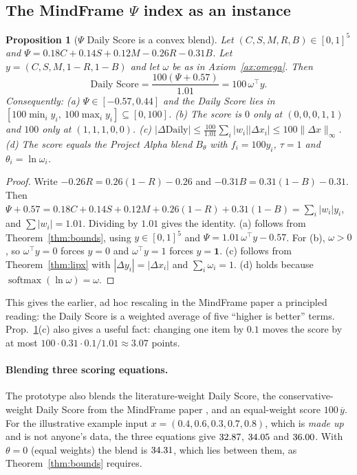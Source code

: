 \documentclass[11pt]{article}
\newtheorem{proposition}{Proposition}
\theoremstyle{definition}
\theoremstyle{remark}
\newcommand{\one}{\mathbf{1}}
\newcommand{\ninf}[1]{\lVert #1\rVert_\infty}
\DeclareMathOperator{\softmax}{softmax}
\begin{document}
\subsection{The MindFrame $\Psi$ index as an instance}
\begin{proposition}[$\Psi$ Daily Score is a convex blend]\label{prop:psi}
Let $(C,S,M,R,B)\in[0,1]^5$ and $\Psi=0.18C+0.14S+0.12M-0.26R-0.31B$. Let $y=(C,S,M,1-R,1-B)$ and let $\omega$ be as in Axiom~\ref{ax:omega}. Then
\[\text{Daily Score}=\frac{100(\Psi+0.57)}{1.01}=100\,\omega^\top y .\]
Consequently: (a) $\Psi\in[-0.57,0.44]$ and the Daily Score lies in $[100\min_iy_i,\ 100\max_iy_i]\subseteq[0,100]$. (b) The score is $0$ only at $(0,0,0,1,1)$ and $100$ only at $(1,1,1,0,0)$. (c) $|\Delta\text{Daily}|\le\frac{100}{1.01}\sum_i|w_i||\Delta x_i|\le100\ninf{\Delta x}$.
(d) The score equals the Project Alpha blend $B_\theta$ with $f_i=100y_i$, $\tau=1$ and $\theta_i=\ln\omega_i$.
\end{proposition}
\begin{proof}
Write $-0.26R=0.26(1-R)-0.26$ and $-0.31B=0.31(1-B)-0.31$. Then $\Psi+0.57=0.18C+0.14S+0.12M+0.26(1-R)+0.31(1-B)=\sum_i|w_i|y_i$, and $\sum|w_i|=1.01$. Dividing by $1.01$ gives the identity. (a) follows from Theorem~\ref{thm:bounds}, using $y\in[0,1]^5$ and $\Psi=1.01\,\omega^\top y-0.57$. For (b), $\omega>0$, so $\omega^\top y=0$ forces $y=0$ and $\omega^\top y=1$ forces $y=\one$. (c) follows from Theorem~\ref{thm:lipx} with $|\Delta y_i|=|\Delta x_i|$ and $\sum_i\omega_i=1$. (d) holds because $\softmax(\ln\omega)=\omega$.
\end{proof}
This gives the earlier, ad hoc rescaling in the MindFrame paper a principled reading: the Daily Score is a weighted average of five ``higher is better'' terms. Prop.~\ref{prop:psi}(c) also gives a useful fact: changing one item by $0.1$ moves the score by at most $100\cdot0.31\cdot0.1/1.01\approx3.07$ points.

\paragraph{Blending three scoring equations.} The prototype also blends the literature-weight Daily Score, the conservative-weight Daily Score from the MindFrame paper \citep{espinosa2026mindframe}, and an equal-weight score $100\,\overline{y}$. For the illustrative example input $x=(0.4,0.6,0.3,0.7,0.8)$, which is \emph{made up} and is not anyone's data, the three equations give $32.87$, $34.05$ and $36.00$. With $\theta=0$ (equal weights) the blend is $34.31$, which lies between them, as Theorem~\ref{thm:bounds} requires.
\end{document}

